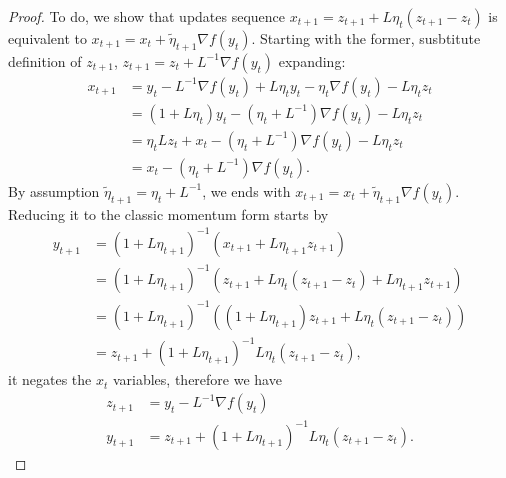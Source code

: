 \documentclass[12pt]{article}
\begin{document}
        \begin{proof}
            To do, we show that updates sequence $x_{t + 1} = z_{t + 1} + L\eta_t (z_{t + 1} - z_t)$ is equivalent to $x_{t + 1} = x_t + \tilde\eta_{t + 1}\nabla f(y_t)$. 
            Starting with the former, susbtitute definition of $z_{t + 1}$, $z_{t + 1} = z_t + L^{-1}\nabla f(y_t)$ expanding: 
            \begin{align*}
                x_{t + 1} &= y_t - L^{-1}\nabla f(y_t) 
                + L \eta_t y_t - \eta_t \nabla f(y_t) - L\eta_t z_t
                \\
                &= 
                (1 + L\eta_t)y_t - (\eta_t + L^{-1})\nabla f(y_t) - L\eta_t z_t
                \\
                &= \eta_t Lz_t + x_t -(\eta_t + L^{-1}) \nabla f(y_t)  - L\eta_t z_t
                \\
                &= x_t - (\eta_t + L^{-1})\nabla f(y_t). 
            \end{align*}
            By assumption $\tilde \eta_{t + 1} = \eta_t + L^{-1}$, we ends with $x_{t + 1} = x_t + \tilde \eta_{t + 1}\nabla f(y_t)$. 
            Reducing it to the classic momentum form starts by 
            \begin{align*}
                y_{t + 1} &= (1 + L\eta_{t + 1})^{-1} (x_{t + 1} + L\eta_{t + 1}z_{t + 1})
                \\
                &= (1 + L\eta_{t + 1})^{-1} (
                    z_{t + 1} + L\eta_t (z_{t + 1} - z_t) + L\eta_{t + 1} z_{t + 1}
                )
                \\
                &= 
                (1 + L\eta_{t + 1})^{-1} (
                    (1 + L\eta_{t + 1})z_{t + 1} + L\eta_t(z_{t + 1} - z_t)
                )
                \\
                &= z_{t + 1} + (1 + L\eta_{t + 1})^{-1}L\eta_t (z_{t + 1} - z_t), 
            \end{align*}
            it negates the $x_t$ variables, therefore we have 
            \begin{align*}
                z_{t + 1} &= y_t - L^{-1}\nabla f(y_t)
                \\
                y_{t + 1} &= z_{t + 1} + (1 + L\eta_{t + 1})^{-1}L\eta_t (z_{t + 1} - z_t).
            \end{align*}
        \end{proof}
\end{document}
